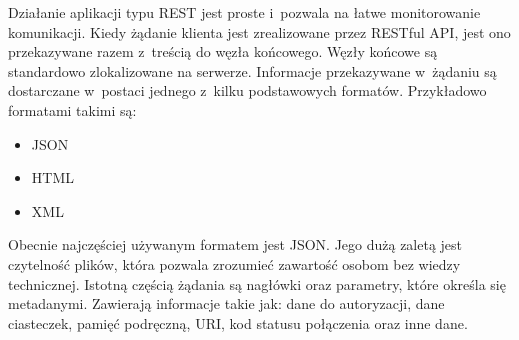 Działanie aplikacji typu REST jest proste i~pozwala na łatwe monitorowanie komunikacji. Kiedy żądanie klienta jest zrealizowane przez RESTful API, jest ono przekazywane razem z~treścią do węzła końcowego.\cite{restapi} Węzły końcowe są standardowo zlokalizowane na serwerze. Informacje przekazywane w~żądaniu są dostarczane w~postaci jednego z~kilku podstawowych formatów. Przykładowo formatami takimi są:
\begin{itemize}
    \item JSON
    \item HTML
    \item XML
\end{itemize}
Obecnie najczęściej używanym formatem jest JSON. Jego dużą zaletą jest czytelność plików, która pozwala zrozumieć zawartość osobom bez wiedzy technicznej. Istotną częścią żądania są nagłówki oraz parametry, które określa się metadanymi. Zawierają informacje takie jak: dane do autoryzacji, dane ciasteczek, pamięć podręczną, URI, kod statusu połączenia oraz inne dane.

